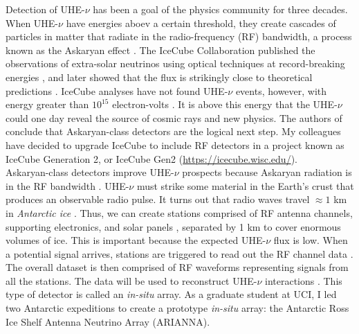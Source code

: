 \documentclass[../../main.tex]{subfiles}
\begin{document}
Detection of UHE-$\nu$ has been a goal of the physics community for three decades.  When UHE-$\nu$ have energies aboev a certain threshold, they create cascades of particles in matter that radiate in the radio-frequency (RF) bandwidth, a process known as the Askaryan effect \cite{ask1} \cite{ask2} \cite{PhysRevLett.86.2802} \cite{PhysRevLett.99.171101, PhysRevD.101.083005}.  The IceCube Collaboration published the observations of extra-solar neutrinos using optical techniques at record-breaking energies \cite{PhysRevLett.111.021103}, and later showed that the flux is strikingly close to theoretical predictions \cite{Aartsen_2015} \cite{WB}.  IceCube analyses have not found UHE-$\nu$ events, however, with energy greater than $10^{15}$ electron-volts \cite{PhysRevD.98.062003}.  It is above this energy that the UHE-$\nu$ could one day reveal the source of cosmic rays and new physics.  The authors of \cite{PhysRevD.98.062003} conclude that Askaryan-class detectors are the logical next step.  My colleagues have decided to upgrade IceCube to include RF detectors in a project known as IceCube Generation 2, or IceCube Gen2 (\url{https://icecube.wisc.edu/}).
\\
\vspace{0.25cm}
Askaryan-class detectors improve UHE-$\nu$ prospects because Askaryan radiation is in the RF bandwidth \cite{10.1016/j.astropartphys.2017.03.008}.  UHE-$\nu$ must strike some material in the Earth's crust that produces an observable radio pulse.  It turns out that radio waves travel $\approx 1$ km in \textit{Antarctic ice} \cite{10.3189/2015jog14j214} \cite{10.3189/2015jog15j057} \cite{barwick_besson_gorham_saltzberg_2005}.  Thus, we can create stations comprised of RF antenna channels, supporting electronics, and solar panels \cite{10.1109/tns.2015.2468182}, separated by 1 km to cover enormous volumes of ice.  This is important because the expected UHE-$\nu$ flux is low.  When a potential signal arrives, stations are triggered to read out the RF channel data \cite{sst}.  The overall dataset is then comprised of RF waveforms representing signals from all the stations.  The data will be used to reconstruct UHE-$\nu$ interactions \cite{10.1088/1475-7516/2019/11/030} \cite{10.1088/1748-0221/15/09/p09039}.  This type of detector is called an \textit{in-situ} array.  As a graduate student at UCI, I led two Antarctic expeditions to create a prototype \textit{in-situ} array: the Antarctic Ross Ice Shelf Antenna Neutrino Array (ARIANNA).
\\
\vspace{0.25cm}
\end{document}
